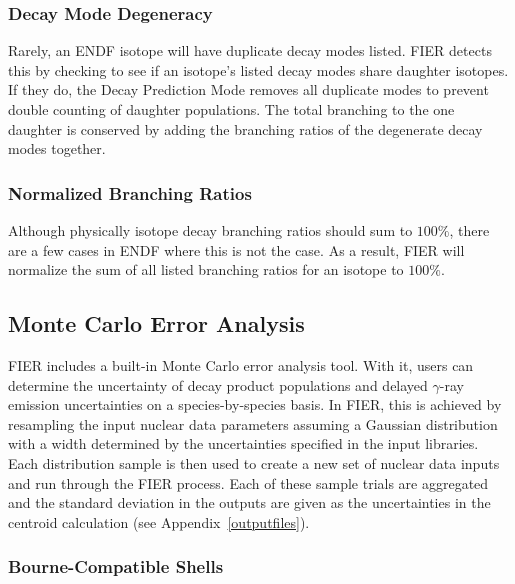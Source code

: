 \documentclass{article}
\begin{document}
\subsubsection{Decay Mode Degeneracy}
Rarely, an ENDF isotope will have duplicate decay modes listed. FIER detects this by checking to see if an isotope's listed decay modes share daughter isotopes. If they do, the Decay Prediction Mode removes all duplicate modes to prevent double counting of daughter populations. The total branching to the one daughter is conserved by adding the branching ratios of the degenerate decay modes together. 

\subsubsection{Normalized Branching Ratios}
Although physically isotope decay branching ratios should sum to $100\%$, there are a few cases in ENDF where this is not the case. As a result, FIER will normalize the sum of all listed branching ratios for an isotope to $100\%$. 

\subsection{Monte Carlo Error Analysis}
FIER includes a built-in Monte Carlo error analysis tool. With it, users can determine the uncertainty of decay product populations and delayed $\gamma$-ray emission uncertainties on a species-by-species basis. In FIER, this is achieved by resampling the input nuclear data parameters assuming a Gaussian distribution with a width determined by the uncertainties specified in the input libraries. Each distribution sample is then used to create a new set of nuclear data inputs and run through the FIER process. Each of these sample trials are aggregated and the standard deviation in the outputs are given as the uncertainties in the centroid calculation (see Appendix~\ref{outputfiles}).

\subsubsection{Bourne-Compatible Shells}
\end{document}
